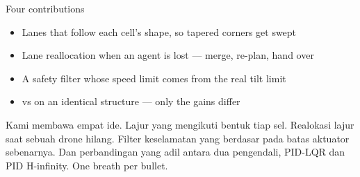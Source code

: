 \documentclass[aspectratio=169,11pt,t]{beamer}
\begin{document}
\begin{frame}{Four contributions}
  \begin{itemize}\bulletgap
    \item Lanes that follow each cell's shape, so tapered corners get swept
    \item Lane reallocation when an agent is lost --- merge, re-plan, hand over
    \item A safety filter whose speed limit comes from the real tilt limit
    \item \lqr{} vs \hinf{} on an identical structure --- only the gains differ
  \end{itemize}
    {Kami membawa empat ide. Lajur yang mengikuti bentuk tiap sel. Realokasi lajur saat sebuah drone hilang. Filter keselamatan yang berdasar pada batas aktuator sebenarnya. Dan perbandingan yang adil antara dua pengendali, PID-LQR dan PID H-infinity.}
    {One breath per bullet.}
\end{frame}
\end{document}
